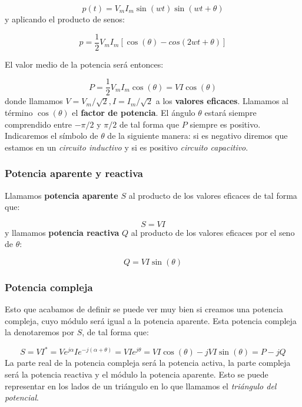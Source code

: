 \documentclass[12pt]{article}
\begin{document}
\begin{equation}
p(t) = V_m I_m \sin (wt) \sin (wt + \theta)
\end{equation}
y aplicando el producto de senos:

\begin{equation}
p = \dfrac{1}{2} V_m I_m [\cos (\theta) - cos(2wt+\theta)]
\end{equation}

El valor medio de la potencia será entonces:

\begin{equation}
P = \dfrac{1}{2} V_m I_m \cos (\theta) = V I \cos (\theta)
\end{equation}
donde llamamos $V = V_m/\sqrt{2}, I = I_m / \sqrt{2}$ a los \textbf{valores eficaces}. Llamamos al término $\cos ( \theta )$ el \textbf{factor de potencia}. El ángulo $\theta$ estará siempre comprendido entre $-\pi/2$ y $\pi/2$ de tal forma que $P$ siempre es positivo. Indicaremos el símbolo de $\theta$ de la siguiente manera: si es negativo diremos que estamos en un \textit{circuito inductivo} y si es positivo \textit{circuito capacitivo}. 


\subsubsection{Potencia aparente y reactiva}

Llamamos \textbf{potencia aparente} $S$ al producto de los valores eficaces de tal forma que:

\begin{equation}
S = VI
\end{equation}
y llamamos \textbf{potencia reactiva} $Q$ al producto de los valores eficaces por el seno de $\theta$:

\begin{equation}
Q = VI \sin (\theta)
\end{equation}

\subsubsection{Potencia compleja}

Esto que acabamos de definir se puede ver muy bien si creamos una potencia compleja, cuyo módulo será igual a la potencia aparente. Esta potencia compleja la denotaremos por $S$, de tal forma que:

\begin{equation}
S = V I^* = Ve^{j \alpha} I e^{-j(\alpha + \theta)} = VI e^{j \theta} = VI \cos (\theta) - j VI \sin (\theta) = P - j Q
\end{equation}
La parte real de la potencia compleja será la potencia activa, la parte compleja será la potencia reactiva y el módulo la potencia aparente. Esto se puede representar en los lados de un triángulo en lo que llamamos el \textit{triángulo del potencial}.
\end{document}
